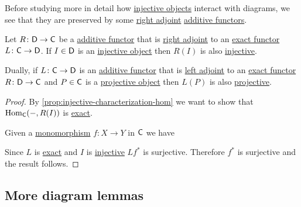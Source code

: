 \documentclass[../../main]{subfiles}
\begin{document}
Before studying more in detail how \hyperref[def:injective-projective-object]{injective objects} interact with diagrams, we see that they are preserved by some \hyperref[def:adjoint-functors]{right adjoint} \hyperref[def:additive-functor]{additive functors}.
\begin{proposition}\label{prop:adjoints-and-injectives}
  Let \(R\colon \mathsf{D} \to \mathsf{C}\) be a \hyperref[def:additive-functor]{additive functor} that is \hyperref[def:adjoint-functors]{right adjoint} to an \hyperref[def:exact-functor]{exact functor} \(L\colon \mathsf{C} \to \mathsf{D}\).
  If \(I \in \mathsf{D}\) is an \hyperref[def:injective-projective-object]{injective object} then \(R(I)\) is also \hyperref[def:injective-projective-object]{injective}.
  
  Dually, if \(L\colon \mathsf{C} \to \mathsf{D}\) is an \hyperref[def:additive-functor]{additive functor} that is \hyperref[def:adjoint-functors]{left adjoint} to an \hyperref[def:exact-functor]{exact functor} \(R\colon \mathsf{D} \to \mathsf{C}\) and \(P \in \mathsf{C}\) is a \hyperref[def:injective-projective-object]{projective object} then \(L(P)\) is also \hyperref[def:injective-projective-object]{projective}.
\end{proposition}
\begin{proof}
  By \autoref{prop:injective-characterization-hom} we want to show that \(\operatorname{Hom}_{\mathsf{C}}(-, R(I))\) is \hyperref[def:exact-functor]{exact}.
  
  Given a \hyperref[def:mono-epi-morphism]{monomorphism} \(f\colon X \to Y\) in \(\mathsf{C}\) we have
  \begin{center}
  \end{center}
  Since \(L\) is \hyperref[def:exact-functor]{exact} and \(I\) is \hyperref[def:injective-projective-object]{injective} \(Lf^{\ast}\) is surjective.
  Therefore \(f^{\ast}\) is surjective and the result follows.
\end{proof}

\subsection{More diagram lemmas}
\end{document}

